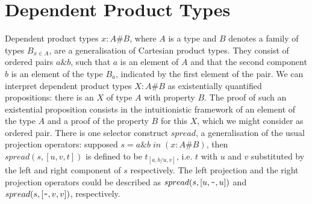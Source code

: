 \documentclass[11pt]{report}
\newcommand{\inv}[1]{\index{#1}}
\begin{document}
  
 \section{Dependent Product Types}
 \inv{dependent product type}
 Dependent product types $x:A\#B$, where $A$ is a type and $B$ denotes
 a family of types $B_{x\in A}$, are a generalisation of 
 Cartesian product types. They consist of ordered pairs $a\&b$, 
 such that $a$ is an element of $A$ and that the second component $b$
 is an element of the type $B_a$, indicated by the first element
 of the pair.
 We can interpret dependent product types $X:A\#B$ as existentially
 quantified propositions: there is an $X$ of type $A$ with property
 $B$. The proof of such an existential proposition consists in
 the intuitionistic framework of an element of the type $A$ and
 a proof of the property $B$ for this $X$, which we might consider
 as ordered pair. There is one selector 
 construct $spread$, a generalisation of the usual
 projection operators: supposed $s=a\&b\;in\;(x:A\#B)$, then 
 $spread(s,[u,v,t])$ is defined to be
 $t_{[a,b/u,v]}$, i.e. $t$ with $u$ and $v$ substituted by the left 
 and right component of $s$ respectively.
 The left projection and the right projection operators could be
 described as $spread(s,[u,\verb'~',u])$ and 
 $spread(s,[\verb'~',v,v])$, respectively.
  
\end{document}
